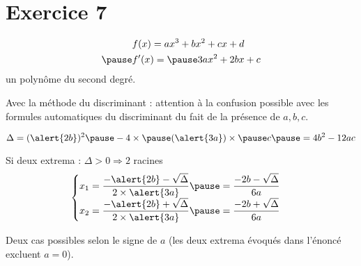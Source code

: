 \documentclass[9pt,handout,professionalfonts,hyperref]{beamer}
\begin{document}
\begin{frame}
\begin{adjustbox}{width=\textwidth,center}
\end{adjustbox}
\end{frame}

\section{Exercice 7}

\begin{frame}
\[\begin{aligned}
&f(x)=ax^3+bx^2+cx+d \\
\pause &f'(x)= \pause 3ax^2+2bx+c
\end{aligned}\]\newline 
un polynôme du second degré.\newline 

\pause Avec la méthode du discriminant : \alert{attention à la confusion possible avec les formules automatiques du discriminant du fait de la présence de $a,b,c$.} 

$$\Delta = (\alert{2b})^2\pause -4\times\pause (\alert{3a})\times\pause  c \pause = 4b^2 -12ac$$
\pause

\pause Si deux extrema : $\Delta>0 \Rightarrow 2$ racines %
\pause
\[\begin{cases}
x_1 = \dfrac{-\alert{2b}-\sqrt\Delta}{2\times \alert{3a}}\pause=\dfrac{-2b-\sqrt\Delta}{6a} \\
x_2 = \dfrac{-\alert{2b}+\sqrt\Delta}{2\times \alert{3a}}\pause =\dfrac{-2b+\sqrt\Delta}{6a}
\end{cases}\]\newline 

Deux cas possibles selon le signe de $a$ (les deux extrema évoqués dans l'énoncé excluent $a=0$). 
\end{frame}
\end{document}

